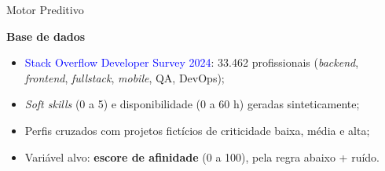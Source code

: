 \documentclass{beamer}
\begin{document}
\begin{frame}[allowframebreaks]{Motor Preditivo}
    \raggedright \textbf{Base de dados}
    \begin{itemize}
        \item \textcolor{blue}{Stack Overflow Developer Survey 2024}: 33.462 profissionais (\textit{backend}, \textit{frontend}, \textit{fullstack}, \textit{mobile}, QA, DevOps);
        \item \textit{Soft skills} (0 a 5) e disponibilidade (0 a 60 h) geradas sinteticamente;
        \item Perfis cruzados com projetos fictícios de criticidade baixa, média e alta;
        \item Variável alvo: \textbf{escore de afinidade} (0 a 100), pela regra abaixo + ruído.
    \end{itemize}
    \begin{table}
        \scriptsize
        \caption{Pesos de cada componente do escore conforme a criticidade.}
    \end{table}

    \framebreak


\end{frame}
\end{document}
